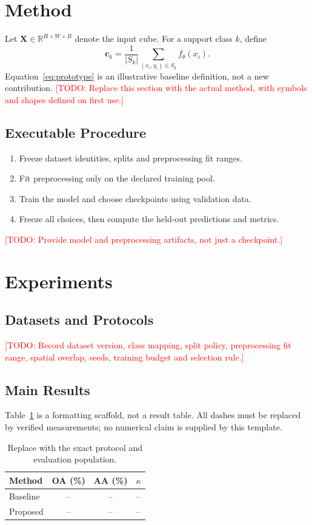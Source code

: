 \documentclass[journal]{IEEEtran}
\newcommand{\placeholder}[1]{\textcolor{red}{[TODO: #1]}}
\begin{document}
\section{Method}
Let $\mathbf{X}\in\mathbb{R}^{H\times W\times B}$ denote the input cube.
For a support class $k$, define
\begin{equation}
\mathbf{c}_k=\frac{1}{|S_k|}\sum_{(x_i,y_i)\in S_k}f_\theta(x_i).
\label{eq:prototype}
\end{equation}
Equation~\ref{eq:prototype} is an illustrative baseline definition, not a new
contribution. \placeholder{Replace this section with the actual method, with
symbols and shapes defined on first use.}

\subsection{Executable Procedure}
\begin{enumerate}
\item Freeze dataset identities, splits and preprocessing fit ranges.
\item Fit preprocessing only on the declared training pool.
\item Train the model and choose checkpoints using validation data.
\item Freeze all choices, then compute the held-out predictions and metrics.
\end{enumerate}
\placeholder{Provide model and preprocessing artifacts, not just a checkpoint.}

\section{Experiments}
\subsection{Datasets and Protocols}
\placeholder{Record dataset version, class mapping, split policy, preprocessing
fit range, spatial overlap, seeds, training budget and selection rule.}

\subsection{Main Results}
Table~\ref{tab:main} is a formatting scaffold, not a result table. All dashes must
be replaced by verified measurements; no numerical claim is supplied by this template.
\begin{table}[!t]
\centering
\caption{Replace with the exact protocol and evaluation population.}
\label{tab:main}
\begin{tabular}{lccc}
\toprule
Method & OA (\%) & AA (\%) & $\kappa$ \\
\midrule
Baseline & -- & -- & -- \\
Proposed & -- & -- & -- \\
\bottomrule
\end{tabular}
\end{table}
\end{document}
